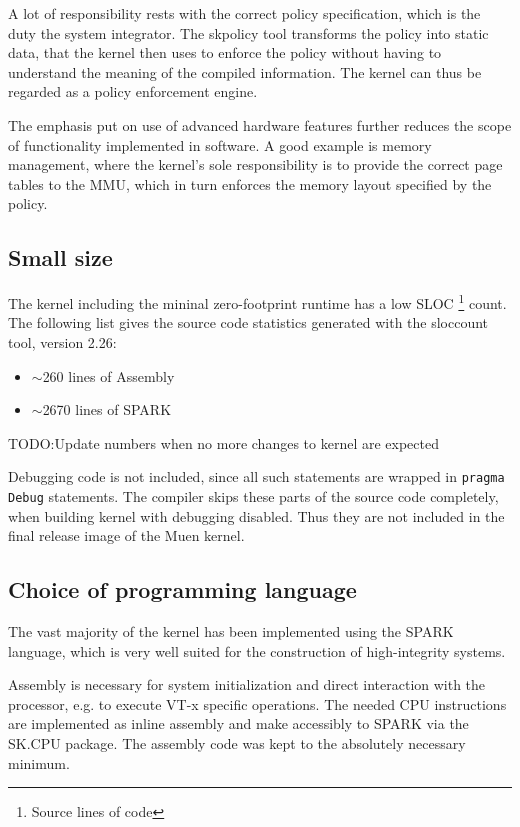 A lot of responsibility rests with the correct policy specification, which is
the duty the system integrator. The skpolicy tool transforms the policy into
static data, that the kernel then uses to enforce the policy without having to
understand the meaning of the compiled information. The kernel can thus be
regarded as a policy enforcement engine.

The emphasis put on use of advanced hardware features further reduces the scope
of functionality implemented in software. A good example is memory management,
where the kernel's sole responsibility is to provide the correct page tables to
the MMU, which in turn enforces the memory layout specified by the policy.

\subsection{Small size}
The kernel including the mininal zero-footprint runtime has a low SLOC
\footnote{Source lines of code} count. The following list gives the source code
statistics generated with the sloccount tool, version 2.26:

\begin{itemize}
	\item $\sim$260 lines of Assembly
	\item $\sim$2670 lines of SPARK
\end{itemize}

TODO:Update numbers when no more changes to kernel are expected

Debugging code is not included, since all such statements are wrapped in
\texttt{pragma Debug} statements. The compiler skips these parts of the source
code completely, when building kernel with debugging disabled. Thus they are not
included in the final release image of the Muen kernel.

\subsection{Choice of programming language}
The vast majority of the kernel has been implemented using the SPARK language,
which is very well suited for the construction of high-integrity systems.

Assembly is necessary for system initialization and direct interaction with the
processor, e.g. to execute VT-x specific operations. The needed CPU instructions
are implemented as inline assembly and make accessibly to SPARK via the SK.CPU
package. The assembly code was kept to the absolutely necessary minimum.

